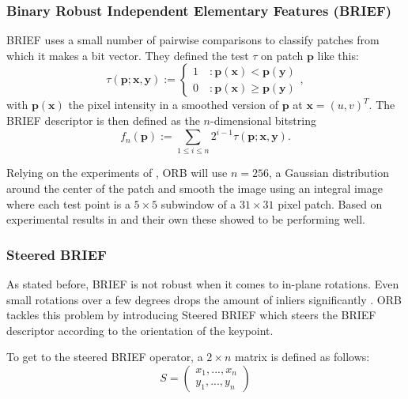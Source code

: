 \subsubsection{Binary Robust Independent Elementary Features (BRIEF)}
BRIEF \cite{10.1007/978-3-642-15561-1_56} uses a small number of pairwise comparisons to classify patches from which it makes a bit vector. They defined the test $\tau$ on patch $\boldsymbol{p}$ like this:
\begin{equation}
    \tau(\boldsymbol{p};\boldsymbol{x},\boldsymbol{y}) := \left\{\begin{array}{ll}
         1\quad : \boldsymbol{p}(\boldsymbol{x}) < \boldsymbol{p}(\boldsymbol{y})\\
         0\quad : \boldsymbol{p}(\boldsymbol{x}) \geq \boldsymbol{p}(\boldsymbol{y})
    \end{array} \right.,
\end{equation}
with $\boldsymbol{p}(\boldsymbol{x})$ the pixel intensity in a smoothed version of $\boldsymbol{p}$ at $\boldsymbol{x} = (u, v)^T$. The BRIEF descriptor is then defined as the $n$-dimensional bitstring
\begin{equation}
    f_n(\boldsymbol{p}) := \sum_{1\leq i\leq n} 2^{i-1}\tau(\boldsymbol{p};\boldsymbol{x},\boldsymbol{y}) .
\end{equation}

Relying on the experiments of \cite{10.1007/978-3-642-15561-1_56}, ORB will use $n = 256$, a Gaussian distribution around the center of the patch and smooth the image using an integral image where each test point is a $5 \times 5$ subwindow of a $31 \times 31$ pixel patch. Based on experimental results in \cite{10.1007/978-3-642-15561-1_56} and their own these showed to be performing well.

\subsubsection{Steered BRIEF}
As stated before, BRIEF is not robust when it comes to in-plane rotations. Even small rotations over a few degrees drops the amount of inliers significantly \cite{6126544}. ORB tackles this problem by introducing Steered BRIEF which steers the BRIEF descriptor according to the orientation of the keypoint. \bigskip

To get to the steered BRIEF operator, a $2\times n$ matrix is defined as follows:
\begin{equation}
    S = \begin{pmatrix}
    x_1,...,x_n \\
    y_1,...,y_n
    \end{pmatrix}
\end{equation}


